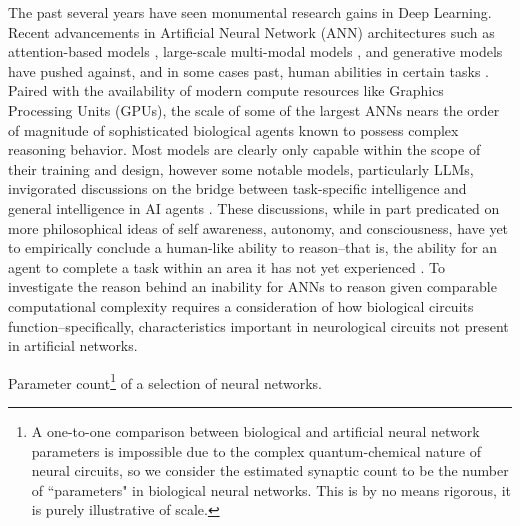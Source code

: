 \documentclass{article}
\begin{document}
\begin{multicols}{2}
	The past several years have seen monumental research gains in Deep Learning. Recent advancements in Artificial Neural Network (ANN) architectures such as attention-based models \cite{vaswani2017}, large-scale multi-modal models \cite{ngaim2011}, and generative models have pushed against, and in some cases past, human abilities in certain tasks \cite{taloni2023}. Paired with the availability of modern compute resources like Graphics Processing Units (GPUs), the scale of some of the largest ANNs nears the order of magnitude of sophisticated biological agents known to possess complex reasoning behavior. Most models are clearly only capable within the scope of their training and design, however some notable models, particularly LLMs, invigorated discussions on the bridge between task-specific intelligence and general intelligence in AI agents \cite{sonoko2024} \cite{li2023}. These discussions, while in part predicated on more philosophical ideas of self awareness, autonomy, and consciousness, have yet to empirically conclude a human-like ability to reason--that is, the ability for an agent to complete a task within an area it has not yet experienced \cite{goertzel2014}. To investigate the reason behind an inability for ANNs to reason given comparable computational complexity requires a consideration of how biological circuits function--specifically, characteristics important in neurological circuits not present in artificial networks.
	
	\begin{center}
	
	Parameter count\footnote{A one-to-one comparison between biological and artificial neural network parameters is impossible due to the complex quantum-chemical nature of neural circuits, so we consider the estimated synaptic count to be the number of ``parameters" in biological neural networks. This is by no means rigorous, it is purely illustrative of scale.} of a selection of neural networks. 
	
	\vspace{5pt}
	{\small
	
}
\end{center}
\end{multicols}
\end{document}
